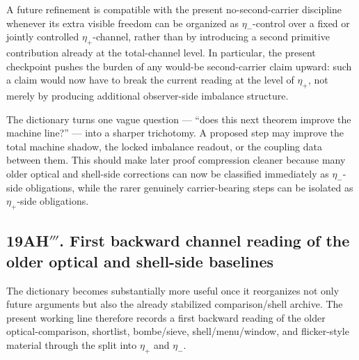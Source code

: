 \begin{corollary}
A future refinement is compatible with the present no-second-carrier discipline whenever its extra visible freedom can be organized as \(\eta_-\)-control over a fixed or jointly controlled \(\eta_+\)-channel, rather than by introducing a second primitive contribution already at the total-channel level. In particular, the present checkpoint pushes the burden of any would-be second-carrier claim upward: such a claim would now have to break the current reading at the level of \(\eta_+\), not merely by producing additional observer-side imbalance structure.
\end{corollary}

\begin{remark}
The dictionary turns one vague question --- ``does this next theorem improve the machine line?'' --- into a sharper trichotomy. A proposed step may improve the total machine shadow, the locked imbalance readout, or the coupling data between them. This should make later proof compression cleaner because many older optical and shell-side corrections can now be classified immediately as \(\eta_-\)-side obligations, while the rarer genuinely carrier-bearing steps can be isolated as \(\eta_+\)-side obligations.
\end{remark}

\subsection*{19AH$'''$. First backward channel reading of the older optical and shell-side baselines}
The dictionary becomes substantially more useful once it reorganizes not only future arguments but also the already stabilized comparison/shell archive. The present working line therefore records a first backward reading of the older optical-comparison, shortlist, bombe/sieve, shell/menu/window, and flicker-style material through the split into \(\eta_+\) and \(\eta_-\).

